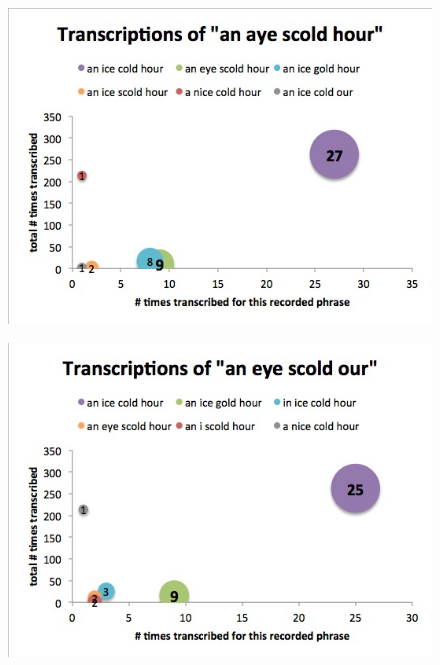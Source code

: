 \begin{figure}[h]
\begin{center}
\includegraphics[width=\piechartwidth]{bubbleChartTranscriptionFrequency_anAyeScoldHour.jpg}
\captionfonts
\caption[Most common transcriptions for the recorded phrase "anAyeScoldHour"]{}
\label{bubbleChart:anAyeScoldHour}
\end{center}
\end{figure}

\begin{figure}[h]
\begin{center}
\includegraphics[width=\piechartwidth]{bubbleChartTranscriptionFrequency_anEyeScoldOur.jpg}
\captionfonts
\caption[Most common transcriptions for the recorded phrase "anEyeScoldOur"]{}
\label{bubbleChart:anEyeScoldOur}
\end{center}
\end{figure}

